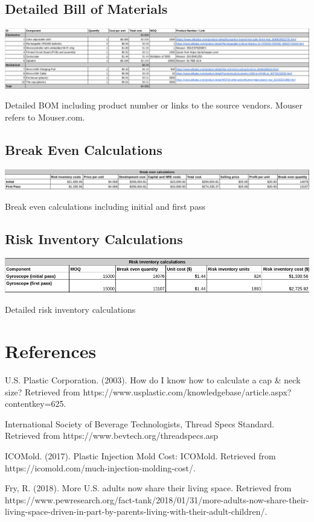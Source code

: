 \documentclass[12pt]{article}
\begin{document}
		\subsection*{Detailed Bill of Materials}
		\begin{table}[H]
			\includegraphics[width=\textwidth]{bom_large.png}
			
			\caption{Detailed BOM including product number or links to the source vendors. Mouser refers to Mouser.com.}
		\end{table}
		\subsection*{Break Even Calculations}
				\begin{table}[H]
			\includegraphics[width=\textwidth]{breakeven.png}
			
			\caption{ Break even calculations including initial and first pass}
		\end{table}
		\subsection*{Risk Inventory Calculations}
				\begin{table}[H]
			\includegraphics[width=\textwidth]{risk.png}
			\caption{Detailed risk inventory calculations}
		\end{table}
	
			
	\section*{References}

	U.S. Plastic Corporation. (2003). How do I know how to calculate a cap \& neck size? Retrieved from https://www.usplastic.com/knowledgebase/article.aspx?contentkey=625. 
	
	International Society of Beverage Technologists, Thread Specs Standard. Retrieved from https://www.bevtech.org/threadspecs.asp
	
	ICOMold. (2017). Plastic Injection Mold Cost: ICOMold. Retrieved from https://icomold.com/much-injection-molding-cost/. 
	
	Fry, R. (2018). More U.S. adults now share their living space. Retrieved from https://www.pewresearch.org/fact-tank/2018/01/31/more-adults-now-share-their-living-space-driven-in-part-by-parents-living-with-their-adult-children/. 
\end{document}

